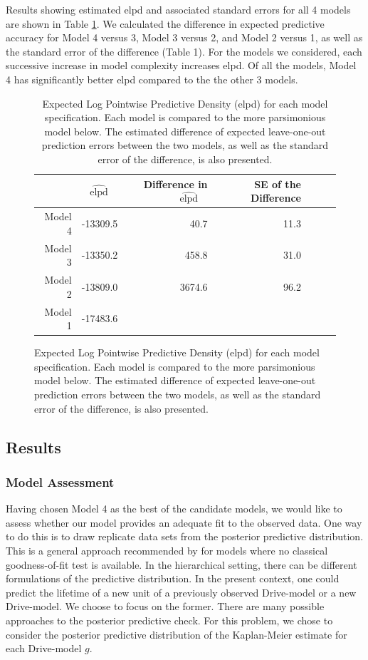 \documentclass[12pt]{article}
\begin{document}
Results showing estimated elpd and associated standard errors for all 4 models are shown in Table \ref{table:2}.
 We calculated the difference in expected predictive accuracy for Model 4 versus 3, Model 3 versus 2, and Model 2 versus 1, as well as the standard error of the difference (Table 1).  
For the models we considered, each successive increase in model complexity increases elpd.  Of all the models, Model 4 has significantly better elpd compared to the the other 3 models.
\begin{figure}
\begin{table}[H]
\centering
\begin{tabular}{rrrrrrr}
  \hline
 & $\widehat{\text{elpd}}$ \ & Difference in $\widehat{\text{elpd}}$ \ & SE of the Difference \\ 
  \hline
Model 4 & -13309.5 & 40.7 & 11.3 \\ 
Model 3 & -13350.2 & 458.8 & 31.0  \\ 
Model 2 & -13809.0 & 3674.6 & 96.2 \\ 
Model 1 & -17483.6  \\ 
   \hline
\end{tabular}
\caption{Expected Log Pointwise Predictive Density (elpd) for each model specification.  Each model is compared to the more parsimonious model below.  The estimated difference of expected leave-one-out prediction errors between the two models, as well as the standard error of the difference, is also presented.}
\label{table:2}
\end{table}
\end{figure}
\subsection{Results}
\subsubsection{Model Assessment}
Having chosen Model 4 as the best of the candidate models, we would like to assess whether our model provides an adequate fit to the observed data. One way to do this is to draw replicate data sets from the posterior predictive distribution. This is a general approach recommended by \cite{gelman1996postpred} for models where no classical goodness-of-fit test is available. In the hierarchical setting, there can be different formulations of the predictive distribution. In the present context, one could predict the lifetime of a new unit of a previously observed Drive-model or a new Drive-model. We choose to focus on the former.  There are many possible approaches to the posterior predictive check. For this problem, we chose to consider the posterior predictive distribution of the Kaplan-Meier estimate for each Drive-model $g$.
\end{document}
